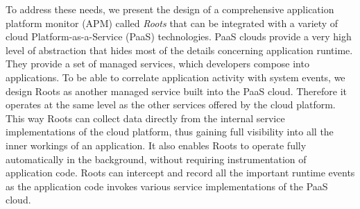 To address these needs, we present the design of  a comprehensive application platform 
monitor (APM) called \textit{Roots} that can be integrated
with a variety of cloud Platform-as-a-Service (PaaS) technologies. 
PaaS clouds provide a very high level of abstraction that hides most of the details concerning application
runtime. They provide a set of managed services, which developers compose into applications.
To be able to correlate application activity with system events,
we design Roots as another managed service built into the PaaS cloud. Therefore
it operates at the same level as the other services offered by the cloud platform. This way Roots can collect data
directly from the internal service implementations of the cloud platform, thus gaining full visibility into all the 
inner workings of an application. It also enables Roots to operate fully automatically in the background, without
requiring instrumentation of application code. Roots can intercept and record all the important runtime events as the
application code invokes various service implementations of the PaaS cloud.


